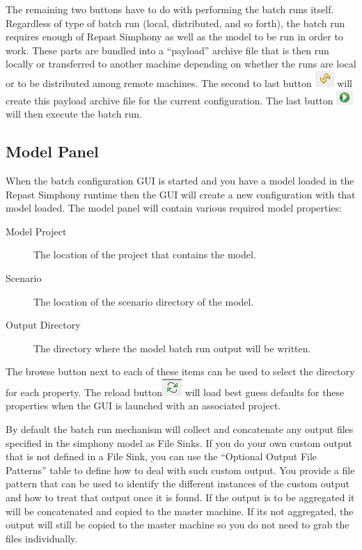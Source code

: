 \documentclass[11pt]{amsart}
\begin{document}
The remaining two buttons have to do with performing the batch runs itself. Regardless of type of batch run (local, distributed, and so forth), the batch run requires enough of Repast Simphony as well as the model to be run in order to work. These parts are bundled into a ``payload'' archive file that is then run locally or transferred to another machine depending on whether the runs are local or to be distributed among remote machines. The second to last button \includegraphics[height=.2in]{images/create_archive_button.png} will create this payload archive file for the current configuration. The last button  \includegraphics[height=.2in]{images/run_button.png} will then execute the batch run.

\subsection{Model Panel}
When the batch configuration GUI is started and you have a model loaded in the Repast Simphony runtime then the GUI will create a new configuration with that model loaded. The model panel will contain various required model properties:

\begin{description}
\item[Model Project] The location of the project that contains the model. 
\item[Scenario] The location of the scenario directory of the model. 
\item[Output Directory] The directory where the model batch run output will be written.
\end{description}

The browse button next to each of these items can be used to select the directory for each property. The reload button\includegraphics[height=.2in]{images/reload_button.png}  will load best guess defaults for these properties when the GUI is launched with an associated project.

By default the batch run mechanism will collect and concatenate any output files specified in the simphony model as File Sinks. If you do your own custom output that is not defined in a File Sink, you can use the ``Optional Output File Patterns'' table to define how to deal with such custom output. You provide a file pattern that can be used to identify the different instances of the custom output and how to treat that output once it is found. If the output is to be aggregated it will be concatenated and copied to the master machine. If its not aggregated, the output will still be copied to the master machine so you do not need to grab the files individually. 
\end{document}
